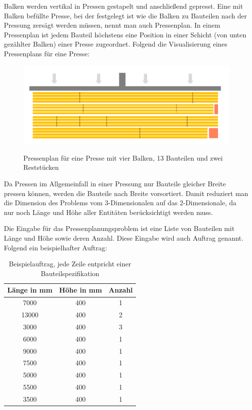 Balken werden vertikal in Pressen gestapelt und anschließend gepresst.
Eine mit Balken befüllte Presse, bei der festgelegt ist wie die Balken zu Bauteilen nach der Pressung zersägt werden müssen, nennt man auch Pressenplan.
In einem Pressenplan ist jedem Bauteil höchstens eine Position in einer Schicht (von unten gezählter Balken) einer Presse zugeordnet.
Folgend die Visualisierung eines Pressenplans für eine Presse:

\begin{figure}[h]
    \centering
    \includegraphics[width=1.00\textwidth, center]{Images/Pressenplan}\\
    \caption{Pressenplan für eine Presse mit vier Balken, 13 Bauteilen und zwei Reststücken}
    \label{figure:pressenplanproblem}
\end{figure}

Da Pressen im Allgemeinfall in einer Pressung nur Bauteile gleicher Breite pressen können, werden die Bauteile nach Breite vorsortiert.
Damit reduziert man die Dimension des Problems vom 3-Dimensionalen auf das 2-Dimensionale, da nur noch Länge und Höhe aller Entitäten berücksichtigt werden muss.

Die Eingabe für das Pressenplanungsproblem ist eine Liste von Bauteilen mit Länge und Höhe sowie deren Anzahl.
Diese Eingabe wird auch Auftrag genannt.
Folgend ein beispielhafter Auftrag:

\begin{table}[H]
    \centering
    \begin{tabular}{|c|c|c|}
        \hline
        \textbf{Länge in mm} & \textbf{Höhe in mm} & \textbf{Anzahl} \\
        \hline
        7000 & 400 & 1 \\
        13000 & 400 & 2 \\
        3000 & 400 & 3 \\
        6000 & 400 & 1 \\
        9000 & 400 & 1 \\
        7500 & 400 & 1 \\
        5000 & 400 & 1 \\
        5500 & 400 & 1 \\
        3500 & 400 & 1 \\
        \hline
    \end{tabular}
    \caption{Beispielauftrag, jede Zeile entpricht einer Bauteilspezifikation}
    \label{tab:auftrageingabe}
\end{table}

